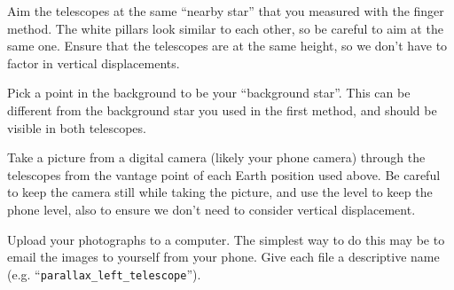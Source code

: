 \begin{steps}
    \item Aim the telescopes at the same ``nearby star'' that you measured with the finger method. The white pillars look similar to each other, so be careful to aim at the same one. Ensure that the telescopes are at the same height, so we don't have to factor in vertical displacements.
    
    \item Pick a point in the background to be your ``background star''. This can be different from the background star you used in the first method, and should be visible in both telescopes.

	\item Take a picture from a digital camera (likely your phone camera) through the telescopes from the vantage point of each Earth position used above. Be careful to keep the camera still while taking the picture, and use the level to keep the phone level, also to ensure we don't need to consider vertical displacement.
	


	\item Upload your photographs to a computer. The simplest way to do this may be to email the images to yourself from your phone. Give each file a descriptive name (e.g. ``\texttt{parallax\_left\_telescope}'').
\end{steps}


